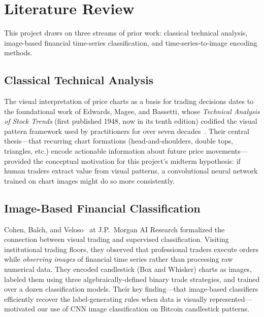 \documentclass[11pt,letterpaper]{article}
\begin{document}
\section{Literature Review}
\label{sec:litreview}

This project draws on three streams of prior work: classical technical analysis,
image-based financial time-series classification, and time-series-to-image
encoding methods.

\subsection{Classical Technical Analysis}

The visual interpretation of price charts as a basis for trading decisions dates
to the foundational work of Edwards, Magee, and Bassetti, whose
\emph{Technical Analysis of Stock Trends} (first published 1948, now in its tenth
edition) codified the visual pattern framework used by practitioners for over
seven decades~\cite{edwards2018}.  Their central thesis---that recurring chart
formations (head-and-shoulders, double tops, triangles, etc.) encode actionable
information about future price movements---provided the conceptual motivation for
this project's midterm hypothesis: if human traders extract value from visual
patterns, a convolutional neural network trained on chart images might do so more
consistently.

\subsection{Image-Based Financial Classification}

Cohen, Balch, and Veloso~\cite{cohen2020} at J.P.~Morgan AI Research formalized
the connection between visual trading and supervised classification.  Visiting
institutional trading floors, they observed that professional traders execute
orders while \emph{observing images} of financial time series rather than
processing raw numerical data.  They encoded candlestick (Box and Whisker) charts
as images, labeled them using three algebraically-defined binary trade strategies,
and trained over a dozen classification models.  Their key finding---that
image-based classifiers efficiently recover the label-generating rules when data
is visually represented---motivated our use of CNN image classification on
Bitcoin candlestick patterns.
\end{document}
